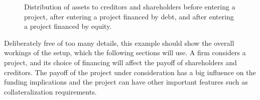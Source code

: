 \documentclass[main.tex]{subfiles}
\begin{document}
    \begin{figure}
        \centering
        \resizebox{\textwidth}{!}{%
        \begin{tikzpicture}
            
        \end{tikzpicture}        
        }   
        \caption{
            Distribution of assets to creditors and shareholders before entering a project,
            after entering a project financed by debt, 
            and after entering a project financed by equity.
        }
        \label{fig:funding-examples}
    \end{figure}

    Deliberately free of too many details, 
    this example should show the overall workings of the setup, 
    which the following sections will use.
    A firm considers a project, 
    and its choice of financing will affect the payoff of shareholders and creditors.
    The payoff of the project under consideration has a big influence on the funding implications
    and the project can have other important features such as collateralization requirements.
\end{document}
